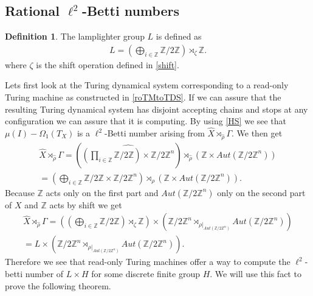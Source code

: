 \documentclass[12pt,a4paper]{scrartcl}
\theoremstyle{plain}
\theoremstyle{definition}
\newtheorem{Definition}[Theorem]{Definition}
\numberwithin{equation}{section}
\newcommand{\Z}{\mathbb{Z}} %
\newcommand{\2}{\mathbb{Z} / 2 \mathbb{Z}}
\newcommand{\1}{\bar{1}}
\newcommand{\0}{\bar{0}}
\begin{document}
\subsection{Rational $\ell^2$-Betti numbers}
\begin{Definition}
	The lamplighter group $L$ is defined as
	\begin{align*}
		L = (\bigoplus_{i \in \Z} \2) \rtimes_{\zeta} \Z.
	\end{align*}
	where $\zeta$ is the shift operation defined in \ref{shift}.
\end{Definition}
Lets first look at the Turing dynamical system corresponding to a read-only Turing machine as constructed in \ref{roTMtoTDS}. If we can assure that the resulting Turing dynamical system has disjoint accepting chains and stops at any configuration we can assure that it is computing. By using \ref{HS} we see that $\mu (I) - \Omega_1(T_X)$ is a $\ell^2$-Betti number arising from $\hat{X} \rtimes_{\hat{\rho}} \Gamma$. We then get
\begin{align*}
	\hat{X} \rtimes_{\hat{\rho}} \Gamma = (\widehat{(\prod_{i \in \Z} \2) \times \2^n}) \rtimes_{\hat{\rho}} (\Z \times Aut(\2^n)) \\
	= (\bigoplus_{i \in \Z} \2 \times \2^n) \rtimes_{\rho} (\Z \times Aut(\2^n)).
\end{align*}
Because $\Z$ acts only on the first part and $Aut(\2^n)$ only on the second part of $X$ and $\Z$ acts by shift we get
\begin{align*}
	\hat{X} \rtimes_{\hat{\rho}} \Gamma = ((\bigoplus_{i \in \Z} \2) \rtimes_{\zeta} \Z) \times (\2^n \rtimes_{\rho|_{Aut(\2^n)}} Aut(\2^n)) \\
	= L \times (\2^n \rtimes_{\rho|_{Aut(\2^n)}} Aut(\2^n)).
\end{align*}
Therefore we see that read-only Turing machines offer a way to compute the $\ell^2$-betti number of $L \times H$ for some discrete finite group $H$. We will use this fact to prove the following theorem.
\end{document}

